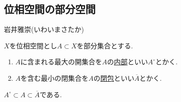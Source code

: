 \documentclass[dvipdfmx,a4paper,11pt]{article}
\newcommand{\R}{\mathbb{R}}
\newcommand{\Z}{\mathbb{Z}}
\newcommand{\C}{\mathbb{C}}
\theoremstyle{definition}
\begin{document}
\begin{enumerate}[label=\textbf{問}\ref*{sec-open}.\arabic*]
 \end{enumerate}
 
\newpage



\begin{center}
\section{位相空間の部分空間}
\label{sec-subspace}
\end{center}

\begin{flushright}
 岩井雅崇(いわいまさたか)
\end{flushright}


 \begin{tcolorbox}[
    colback = white,
    colframe = green!35!black,
    fonttitle = \bfseries,
    breakable = true]
$X$を位相空間とし$A \subset X$を部分集合とする. 
\begin{enumerate}
\setlength{\parskip}{0cm}
  	\setlength{\itemsep}{0pt} 
\item $A$に含まれる最大の開集合を$A$の\underline{内部}といい$A^{\circ}$とかく. 
\item $A$を含む最小の閉集合を$A$の\underline{閉包}といい$\overline{A}$とかく. 
\end{enumerate}
$A^{\circ}\subset A \subset \overline{A}$である.
 \end{tcolorbox}
\end{document}
